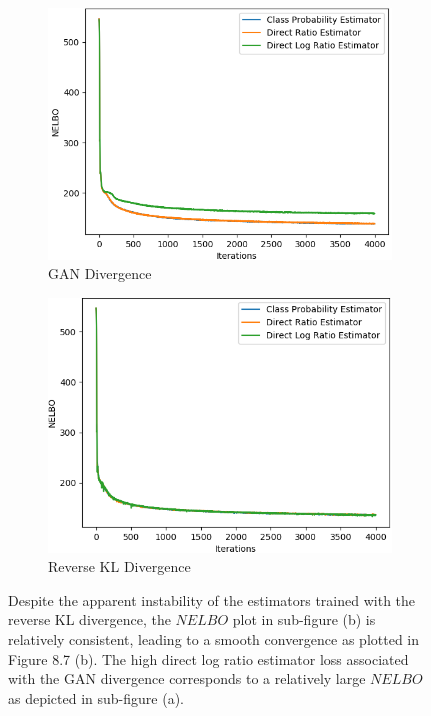 \documentclass[honours,12pt]{unswthesis}
\numberwithin{equation}{section}
\theoremstyle{definition}
\begin{document}
\begin{figure}[h!]
\centering
\begin{subfigure}{0.49\textwidth}
\includegraphics[width=\linewidth]{part3nelbos/PCADVvsPCADVexpvsPCADVgudlog.png}
\caption{GAN Divergence}
\end{subfigure}
\begin{subfigure}{0.49\textwidth}
\includegraphics[width=\linewidth]{part3nelbos/PCKLDvsPCKLexpvsPCKLgudlog.png}
\caption{Reverse KL Divergence}
\end{subfigure}
\caption{\small Despite the apparent instability of the estimators trained with the reverse KL divergence, the $NELBO$ plot in sub-figure (b) is relatively consistent, leading to a smooth convergence as plotted in Figure 8.7 (b). The high direct log ratio estimator loss associated with the GAN divergence corresponds to a relatively large $NELBO$ as depicted in sub-figure (a).}
\end{figure}
\newpage
\end{document}
